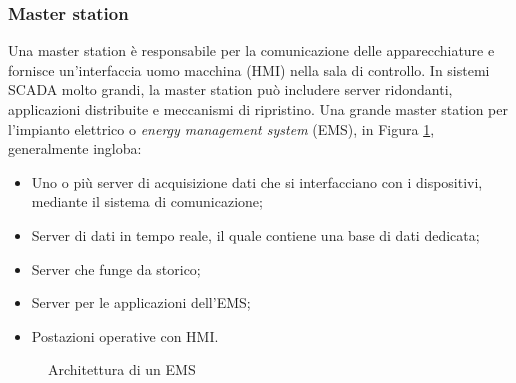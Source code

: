 \subsubsection{Master station \label{subsec:master}}
Una master station è responsabile per la comunicazione delle apparecchiature e fornisce un'interfaccia uomo macchina (HMI) nella sala di controllo. In sistemi SCADA molto grandi, la master station può includere server ridondanti, applicazioni distribuite e meccanismi di ripristino. Una grande master station per l'impianto elettrico o \emph{energy management system} (EMS), in Figura \ref{fig:25}, generalmente ingloba:
\begin{itemize}
	\item Uno o più server di acquisizione dati che si interfacciano con i dispositivi, mediante il sistema di comunicazione;
	\item Server di dati in tempo reale, il quale contiene una base di dati dedicata;
	\item Server che funge da storico;
	\item Server per le applicazioni dell'EMS;
	\item Postazioni operative con HMI.
\end{itemize}    

\begin{figure}[h] 
\caption{Architettura di un EMS}\label{fig:25}
\end{figure}

